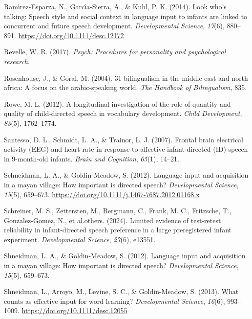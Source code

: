 \documentclass[
  ,man,floatsintext]{apa6}
\newlength{\cslhangindent}
\newlength{\cslentryspacingunit} %
\newenvironment{CSLReferences}[2] %
 {%
  \setlength{\parindent}{0pt}
  \ifodd #1
  \let\oldpar\par
  \def\par{\hangindent=\cslhangindent\oldpar}
  \fi
  \setlength{\parskip}{#2\cslentryspacingunit}
 }%
 {}
\begin{document}
\begin{CSLReferences}{1}{0}
\leavevmode{}%
Ramı́rez-Esparza, N., Garcı́a-Sierra, A., \& Kuhl, P. K. (2014). Look who's talking: Speech style and social context in language input to infants are linked to concurrent and future speech development. \emph{Developmental Science}, \emph{17}(6), 880--891. \url{https://doi.org/10.1111/desc.12172}

\leavevmode{}%
Revelle, W. R. (2017). \emph{Psych: Procedures for personality and psychological research}.

\leavevmode{}%
Rosenhouse, J., \& Goral, M. (2004). 31 bilingualism in the middle east and north africa: A focus on the arabic-speaking world. \emph{The Handbook of Bilingualism}, 835.

\leavevmode{}%
Rowe, M. L. (2012). A longitudinal investigation of the role of quantity and quality of child-directed speech in vocabulary development. \emph{Child Development}, \emph{83}(5), 1762--1774.

\leavevmode{}%
Santesso, D. L., Schmidt, L. A., \& Trainor, L. J. (2007). Frontal brain electrical activity (EEG) and heart rate in response to affective infant-directed (ID) speech in 9-month-old infants. \emph{Brain and Cognition}, \emph{65}(1), 14--21.

\leavevmode{}%
Schneidman, L. A., \& Goldin-Meadow, S. (2012). Language input and acquisition in a mayan village: How important is directed speech? \emph{Developmental Science}, \emph{15}(5), 659--673. \url{https://doi.org/10.1111/j.1467-7687.2012.01168.x}

\leavevmode{}%
Schreiner, M. S., Zettersten, M., Bergmann, C., Frank, M. C., Fritzsche, T., Gonzalez-Gomez, N., et al.others. (2024). Limited evidence of test-retest reliability in infant-directed speech preference in a large preregistered infant experiment. \emph{Developmental Science}, \emph{27}(6), e13551.

\leavevmode{}%
Shneidman, L. A., \& Goldin-Meadow, S. (2012). Language input and acquisition in a mayan village: How important is directed speech? \emph{Developmental Science}, \emph{15}(5), 659--673.

\leavevmode{}%
Shneidman, L., Arroyo, M., Levine, S. C., \& Goldin-Meadow, S. (2013). What counts as effective input for word learning? \emph{Developmental Science}, \emph{16}(6), 993--1009. \url{https://doi.org/10.1111/desc.12055}


\end{CSLReferences}
\end{document}
